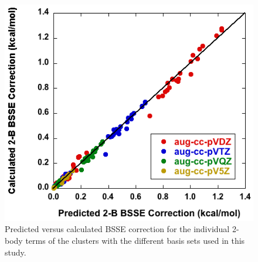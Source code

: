 \begin{figure}[t]
\begin{center}
\includegraphics[width=.5\textwidth]{Figures/Chapter_2/2body_bsse_correlation.tif}
\end{center}
\begin{spacing}{1.0}
\caption[Predicted versus calculated BSSE correction for the individual 2-body terms of the clusters with the different basis sets used in this study.]{Predicted versus calculated BSSE correction for the individual 2-body terms of the clusters with the different basis sets used in this study.}\label{fig:MBE_I_F10}
\end{spacing}
\end{figure}